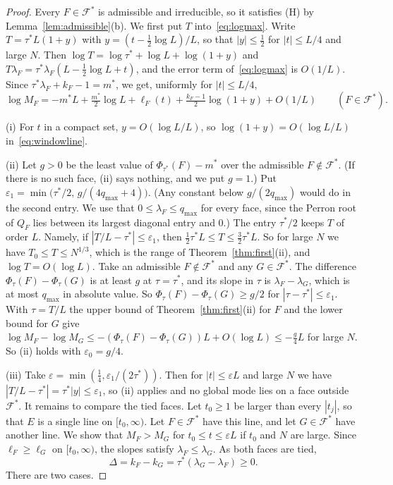 \begin{proof}
Every $F\in\mathcal F^*$ is admissible and irreducible, so it satisfies (H) by
Lemma~\ref{lem:admissible}(b). We first put $T$ into~\eqref{eq:logmax}. Write
$T=\tau^*L(1+y)$ with $y=(t-\frac12\log L)/L$, so that $|y|\le\frac12$ for $|t|\le L/4$ and
large $N$. Then $\log T=\log\tau^*+\log L+\log(1+y)$ and
$T\lambda_F=\tau^*\lambda_F(L-\frac12\log L+t)$, and the error term of~\eqref{eq:logmax} is
$O(1/L)$. Since $\tau^*\lambda_F+k_F-1=m^*$, we get, uniformly for $|t|\le L/4$,
\begin{equation}\label{eq:windowline}
\log M_F=-m^*L+\tfrac{m^*}2\log L+\ell_F(t)+\tfrac{k_F-1}2\log(1+y)+O(1/L)
\qquad(F\in\mathcal F^*).
\end{equation}

(i) For $t$ in a compact set, $y=O(\log L/L)$, so $\log(1+y)=O(\log L/L)$
in~\eqref{eq:windowline}.

(ii) Let $g>0$ be the least value of $\Phi_{\tau^*}(F)-m^*$ over the admissible
$F\notin\mathcal F^*$. (If there is no such face, (ii) says nothing, and we put $g=1$.) Put
$\varepsilon_1=\min\bigl(\tau^*/2,\,g/(4q_{\max}+4)\bigr)$. (Any constant below $g/(2q_{\max})$ would do
in the second entry. We use that $0\le\lambda_F\le q_{\max}$ for every face, since the Perron root of
$Q_F$ lies between its largest diagonal entry and $0$.) The entry $\tau^*/2$ keeps $T$ of
order $L$. Namely, if $|T/L-\tau^*|\le\varepsilon_1$, then
$\frac12\tau^*L\le T\le\frac32\tau^*L$. So for large $N$ we have $T_0\le T\le N^{1/3}$, which is
the range of Theorem~\ref{thm:first}(ii), and $\log T=O(\log L)$. Take an admissible
$F\notin\mathcal F^*$ and any $G\in\mathcal F^*$. The difference $\Phi_\tau(F)-\Phi_\tau(G)$ is at least $g$ at $\tau=\tau^*$,
and its slope in $\tau$ is $\lambda_F-\lambda_G$, which is at most $q_{\max}$ in absolute value. So
$\Phi_\tau(F)-\Phi_\tau(G)\ge g/2$ for $|\tau-\tau^*|\le\varepsilon_1$. With $\tau=T/L$ the
upper bound of Theorem~\ref{thm:first}(ii) for $F$ and the lower bound for $G$ give
$\log M_F-\log M_G\le-(\Phi_\tau(F)-\Phi_\tau(G))L+O(\log L)\le-\frac g4L$ for large $N$. So (ii)
holds with $\varepsilon_0=g/4$.

(iii) Take $\varepsilon=\min(\frac14,\varepsilon_1/(2\tau^*))$. Then for $|t|\le\varepsilon L$
and large $N$ we have $|T/L-\tau^*|=\tau^*|y|\le\varepsilon_1$, so (ii) applies and no global
mode lies on a face outside $\mathcal F^*$. It remains to compare the tied faces. Let $t_0\ge1$
be larger than every $|t_j|$, so that $E$ is a single line on $[t_0,\infty)$. Let
$F\in\mathcal F^*$ have this line, and let $G\in\mathcal F^*$ have another line. We show that
$M_F>M_G$ for $t_0\le t\le\varepsilon L$ if $t_0$ and $N$ are large. Since $\ell_F\ge\ell_G$
on $[t_0,\infty)$, the slopes satisfy $\lambda_F\le\lambda_G$. As both faces are tied,
\[
\Delta=k_F-k_G=\tau^*(\lambda_G-\lambda_F)\ge0 .
\]
There are two cases.


\end{proof}

